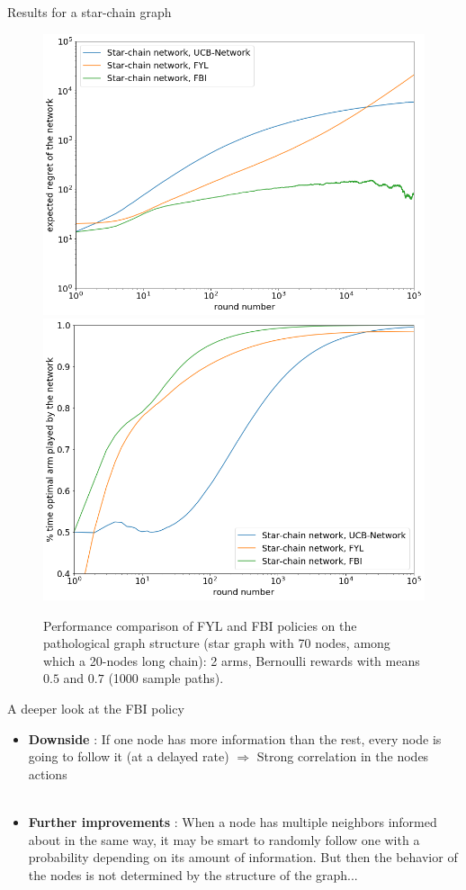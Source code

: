 \documentclass{beamer}
\begin{document}
\begin{frame}{Results for a star-chain graph}
\begin{figure}[H]
  \centering
  \includegraphics[width=0.49\linewidth]{fig5_1.png}
  \includegraphics[width=0.49\linewidth]{fig5_2.png}
  \caption{\centering Performance comparison of FYL and FBI policies on the pathological graph structure (star graph with 70 nodes, among which a 20-nodes long chain): 2 arms, Bernoulli rewards with means $0.5$ and $0.7$ (1000 sample paths).}
\end{figure}
\end{frame}

\begin{frame}{A deeper look at the FBI policy}
\begin{itemize}
\item \textbf{Downside} : If one node has more information than the rest, every node is going to follow it (at a delayed rate) $\Rightarrow$ \alert{Strong correlation in the nodes actions} \\ ~ \\


\item \textbf{Further improvements} : When a node has multiple neighbors informed about in the same way, it may be smart to randomly follow one with a \alert{probability depending on its amount of information}. But then the behavior of the nodes is not determined by the structure of the graph...
\end{itemize}
\end{frame}
\end{document}

